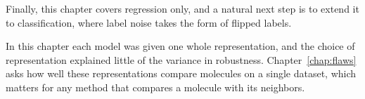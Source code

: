 Finally, this chapter covers regression only, and a natural next step is to extend it to classification, where label noise takes the form of flipped labels.

In this chapter each model was given one whole representation, and the choice of representation explained little of the variance in robustness. Chapter~\ref{chap:flaws} asks how well these representations compare molecules on a single dataset, which matters for any method that compares a molecule with its neighbors.
